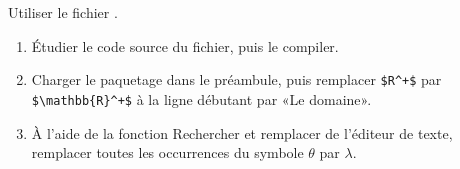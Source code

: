 \begin{exercice}
  Utiliser le fichier .

  \begin{enumerate}
  \item Étudier le code source du fichier, puis le compiler.
  \item Charger le paquetage  dans le préambule, puis
    remplacer \verb=$R^+$= par \verb=$\mathbb{R}^+$= à la ligne
    débutant par «Le domaine».
  \item À l'aide de la fonction Rechercher et remplacer de l'éditeur
    de texte, remplacer toutes les occurrences du symbole $\theta$ par
    $\lambda$.
  \end{enumerate}
\end{exercice}



